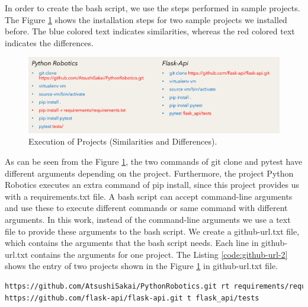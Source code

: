 In order to create the bash script, we use the steps performed in sample projects. 
The Figure \ref{fig:setup difference} shows the installation steps for two sample projects we installed before.
The blue colored text indicates similarities, whereas the red colored text indicates the differences.
\begin{figure}[ht]
    \centering
    \includegraphics[width=1\linewidth]{figures/implementation/Setup-difference.png}
    \caption{Execution of Projects (Similarities and Differences).}
    \label{fig:setup difference}
\end{figure}
As can be seen from the Figure \ref{fig:setup difference}, the two commands of git clone and pytest have different arguments depending on the project.
Furthermore, the project Python Robotics executes an extra command of pip install, since this project provides us with a requirements.txt file.
A bash script can accept command-line arguments and use these to execute different commands or same command with different arguments.
In this work, instead of the command-line arguments we use a text file to provide these arguments to the bash script.
We create a github-url.txt file, which contains the arguments that the bash script needs.
Each line in github-url.txt contains the arguments for one project.
The Listing \ref{code:github-url-2} shows the entry of two projects shown in the Figure \ref{fig:setup difference} in github-url.txt file.
\lstset{numbers=left, numberstyle=\tiny, stepnumber=1, numbersep=5pt, columns=flexible, breaklines=true}
\lstset{basicstyle=\ttfamily}
\lstset{frame=tb}
\begin{lstlisting}[float,caption=Sample Entry github-url.txt,label=code:github-url-2,language=Bash]
https://github.com/AtsushiSakai/PythonRobotics.git rt requirements/requirements.txt tests
https://github.com/flask-api/flask-api.git t flask_api/tests
\end{lstlisting}

